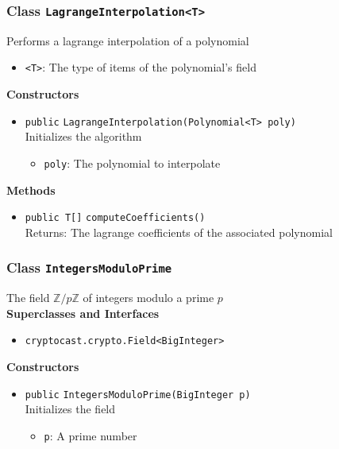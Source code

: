 \subsubsection{Class \lstinline|LagrangeInterpolation<T>|}
Performs a lagrange interpolation of a polynomial \\


\begin{itemize}
\item \lstinline|<T>|: The type of items of the polynomial's field
\end{itemize}


\textbf{Constructors}
\begin{itemize}
\item \lstinline|public| \lstinline|LagrangeInterpolation|\lstinline|(Polynomial<T> poly)|\\
Initializes the algorithm
\begin{itemize}
\item \lstinline|poly|: The polynomial to interpolate
\end{itemize}



\end{itemize}


\textbf{Methods}
\begin{itemize}
\item \lstinline|public T[]| \lstinline|computeCoefficients|\lstinline|()|\\
Returns: The lagrange coefficients of the associated polynomial



\end{itemize}

\subsubsection{Class \lstinline|IntegersModuloPrime|}
The field $\mathbb{Z}/p\mathbb{Z}$ of integers modulo a prime $p$ \\


\textbf{Superclasses and Interfaces}
\begin{itemize}
\item \lstinline|cryptocast.crypto.Field<BigInteger>|
\end{itemize}



\textbf{Constructors}
\begin{itemize}
\item \lstinline|public| \lstinline|IntegersModuloPrime|\lstinline|(BigInteger p)|\\
Initializes the field
\begin{itemize}
\item \lstinline|p|: A prime number
\end{itemize}



\end{itemize}


